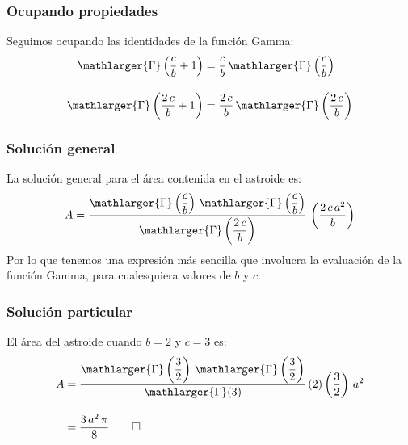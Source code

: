 \documentclass[12pt]{beamer}
\begin{document}
\begin{frame}
\frametitle{Ocupando propiedades}
Seguimos ocupando las identidades de la función Gamma:
\pause 
\begin{align*}
\mathlarger{\Gamma} \left( \dfrac{c}{b} + 1 \right) &= \dfrac{c}{b} \, \mathlarger{\Gamma} \left( \dfrac{c}{b} \right) \\[1em]
\mathlarger{\Gamma} \left( \dfrac{2 \, c}{b} + 1 \right) &= \dfrac{2 \, c}{b} \, \mathlarger{\Gamma} \left( \dfrac{2 \, c}{b} \right)
\end{align*}
\end{frame}
\begin{frame}
\frametitle{Solución general}
La solución general para el área contenida en el astroide es:
\pause
\begin{align*}
A = \dfrac{\mathlarger{\Gamma} \left( \dfrac{c}{b} \right) \, \mathlarger{\Gamma} \left( \dfrac{c}{b} \right)}{\mathlarger{\Gamma} \left( \dfrac{2 \, c}{b} \right)} \, \left( \dfrac{2 \, c \, a^{2}}{b} \right)
\end{align*}
\pause
Por lo que tenemos una expresión más sencilla que involucra la evaluación de la función Gamma, para cualesquiera valores de $b$ y $c$.
\end{frame}
\begin{frame}
\frametitle{Solución particular}
El área del astroide cuando $b = 2$ y $c = 3$ es:
\pause
\begin{align*}
A &= \dfrac{\mathlarger{\Gamma} \left( \dfrac{3}{2} \right) \, \mathlarger{\Gamma} \left( \dfrac{3}{2} \right)}{\mathlarger{\Gamma} (3)} \, (2) \left( \dfrac{3}{2} \right) \, a^{2} \\[1em]
&= \dfrac{3 \, a^{2} \, \pi}{8} \qed
\end{align*}
\end{frame}
\end{document}
